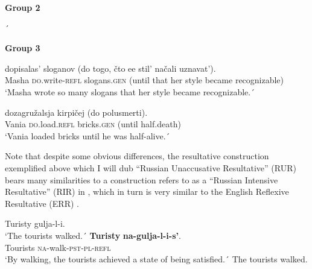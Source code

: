 \documentclass[output=paper,colorlinks,citecolor=brown,nonflat]{./langscibook}
\begin{document}
\textbf{Group 2}


´
    \z

    \z

\textbf{Group 3}

\ea%
    \label{ex:antonyuk:33}
       {dopisalas’}            {sloganov}       {(do}     {togo,} {čto} {ee} {stil’} {načali} uznavat’).\\
    Masha \textsc{do}.write-\textsc{refl}  slogans.\textsc{gen}  (until that   her     style became recognizable)\\
    \glt `Masha wrote so many slogans that her style became recognizable.´
    \z

\ea%
    \label{ex:antonyuk:34}
     {dozagružalsja}    {kirpičej}      {(do}    {polusmerti)}.\\
    Vania \textsc{do}.load.\textsc{refl} bricks.\textsc{gen} (until half.death)\\
    \glt `Vania loaded bricks until he was half-alive.´
    \z

Note that despite some obvious differences, the resultative construction exemplified above which I will dub “Russian Unaccusative Resultative” (RUR) bears many similarities to a construction \citet{Tatevosov2010} refers to as a “Russian Intensive Resultative” (RIR) in , which in turn is very similar to the English Reflexive Resultative (ERR) .


\ea%
    \label{ex:antonyuk:35}
    \ea \label{ex:antonyuk:35a}
    {Turisty} {gulja-l-i}.\\
    `The tourists walked.´
    \ex \label{ex:antonyuk:35b}
    \gll \textbf{Turisty} \textbf{na-gulja-l-i-s’}.\\
    Tourists \textsc{na-}walk\textsc{-pst-pl-refl}\\
    \glt `By walking, the tourists achieved a state of being satisfied.´ The tourists walked.
    \z
\z
{}
\end{document}

